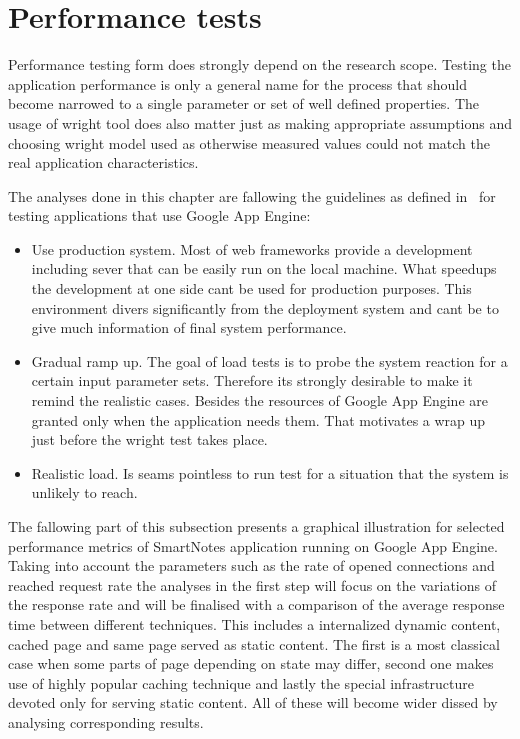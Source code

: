 \section{Performance tests}\label{sec:performance}
Performance testing form does strongly depend on the research scope. Testing the application performance is only a general name for the process that should become narrowed to a single parameter or set of well defined properties. The usage of wright tool does also matter just as making appropriate assumptions and choosing wright model used as otherwise measured values could not match the real application characteristics.   

The analyses done in this chapter are fallowing the guidelines as defined in~\cite{gae_best_practises_plus_load_tests} for testing applications that use Google App Engine:
\begin{itemize}
	\item{Use production system. Most of web frameworks provide a development including sever that can be easily run on the local machine. What speedups the development at one side cant be used for production purposes. This environment divers significantly from the deployment system and cant be to give much information of final system performance.}
	\item{Gradual ramp up. The goal of load tests is to probe the system reaction for a certain input parameter sets. Therefore its strongly desirable to make it remind the realistic cases. Besides the resources of Google App Engine are granted only when the application needs them. That motivates a wrap up just before the wright test takes place.}
	\item{Realistic load. Is seams pointless to run test for a situation that the system is unlikely to reach.}
\end{itemize}
The fallowing part of this subsection presents a graphical illustration for selected performance metrics of SmartNotes application running on Google App Engine. Taking into account the parameters such as the rate of opened connections and reached request rate the analyses in the first step will focus on the variations of the response rate and will be finalised with a comparison of the average response time between different techniques. This includes a internalized dynamic content, cached page and same page served as static content. The first is a most classical case when some parts of page depending on state may differ, second one makes use of highly popular caching technique and lastly the special infrastructure devoted only for serving static content. All of these will become wider dissed by analysing corresponding results. 

